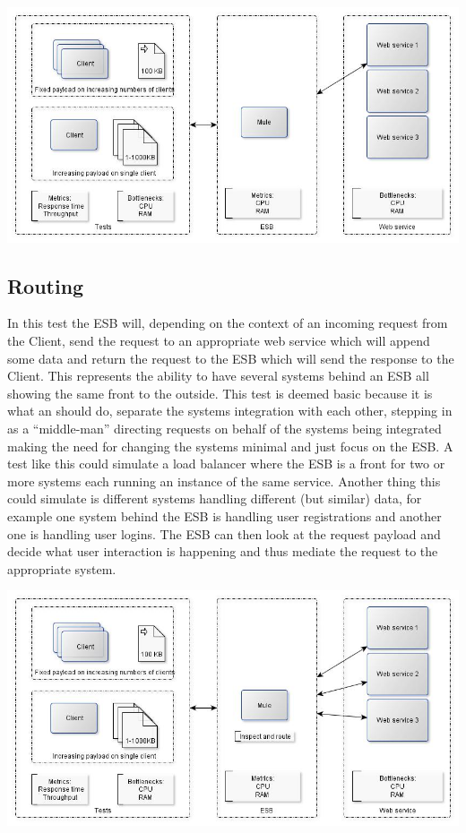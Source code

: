 \centerline{\includegraphics[scale=0.43]{img/direct_proxy}}

\subsection{Routing}
In this test the ESB will, depending on the context of an incoming request from the Client, send the request to an appropriate web service which will append some data and return the request to the ESB which will send the response to the Client.
This represents the ability to have several systems behind an ESB all showing the same front to the outside.
This test is deemed basic because it is what an should do, separate the systems integration with each other, stepping in as a ``middle-man'' directing requests on behalf of the systems being integrated making the need for changing the systems minimal and just focus on the ESB. 
A test like this could simulate a load balancer where the ESB is a front for two or more systems each running an instance of the same service. Another thing this could simulate is different systems handling different (but similar) data, for example one system behind the ESB is handling user registrations and another one is handling user logins. The ESB can then look at the request payload and decide what user interaction is happening and thus mediate the request to the appropriate system.

\centerline{\includegraphics[scale=0.43]{img/Routing}}
